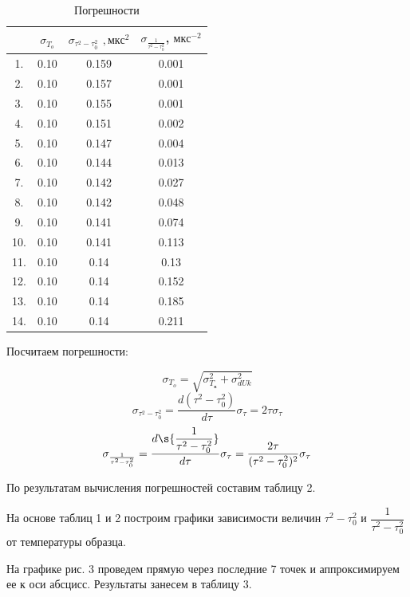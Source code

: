 \documentclass[12pt]{kiarticle}
\begin{document}
\begin{table}
	\caption{Погрешности}
	\begin{tabular}{|c|c|c|c|}
		\hline
		\text{№} & $ \sigma_{T_o}  $ & $  \sigma_{\tau^2 - \tau_0^2} $ $,  мкс^{2}  $ &  $ \sigma_{\frac{1}{\tau^2 - \tau_0^2}} $, $ мкс^{-2}  $ \\
		\hline
		1. & 0.10 & 0.159 & 0.001 \\
		2. & 0.10 & 0.157 & 0.001 \\
		3. & 0.10 & 0.155 & 0.001 \\
		4. & 0.10 & 0.151 & 0.002 \\
		5. & 0.10 & 0.147 & 0.004 \\
		6. & 0.10 & 0.144 & 0.013 \\
		7. & 0.10 & 0.142 & 0.027 \\
		8. & 0.10 & 0.142 & 0.048 \\
		9. & 0.10 & 0.141 & 0.074 \\
		10. & 0.10 & 0.141 & 0.113 \\
		11. & 0.10 & 0.14 & 0.13 \\
		12. & 0.10 & 0.14 & 0.152 \\
		13. & 0.10 & 0.14 & 0.185 \\
		14. & 0.10 & 0.14 & 0.211 \\
		\hline
	\end{tabular}
\end{table}
Посчитаем погрешности: 

$$
\sigma_{T_o} = \sqrt{\sigma_{T_в}^2 + \sigma_{dUk}^2}
$$
\begin{equation}\label{}
\sigma_{\tau^2 - \tau_0^2} = \dfrac{d(\tau^2 - \tau_0^2)}{d\tau}\sigma_\tau = 2\tau\sigma_\tau
\end{equation}
\begin{equation}\label{}
\sigma_{\frac{1}{\tau^2 - \tau_0^2}} = \dfrac{d\s{\dfrac{1}{\tau^2 - \tau_0^2}}}{d\tau}\sigma_\tau = \dfrac{2\tau}{{(\tau^2 - \tau_0^2)^2}}\sigma_\tau
\end{equation}

По результатам вычисления погрешностей составим таблицу 2.

На основе таблиц 1 и 2 построим графики зависимости величин $ \tau^2 - \tau_0^2 $ и $ \dfrac{1}{\tau^2 - \tau_0^2} $ от температуры образца.
\par
На графике рис. 3 проведем прямую через последние 7 точек и аппроксимируем ее к оси абсцисс. Результаты занесем в таблицу 3.
\end{document}
